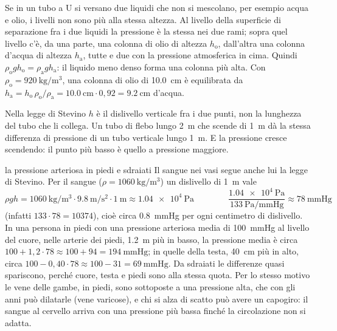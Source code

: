 Se in un tubo a U si versano due liquidi che non si mescolano, per esempio acqua e olio, i livelli non sono più alla stessa altezza. Al livello della superficie di separazione fra i due liquidi la pressione è la stessa nei due rami; sopra quel livello c'è, da una parte, una colonna di olio di altezza $h_\text{o}$, dall'altra una colonna d'acqua di altezza $h_\text{a}$, tutte e due con la pressione atmosferica in cima. Quindi $\rho_\text{o} g h_\text{o} = \rho_\text{a} g h_\text{a}$: il liquido meno denso forma una colonna più alta. Con $\rho_\text{o} = \SI{920}{\kilo\gram\per\metre\cubed}$, una colonna di olio di \SI{10,0}{\centi\metre} è equilibrata da $h_\text{a} = h_\text{o}\,\rho_\text{o}/\rho_\text{a} = \SI{10,0}{\centi\metre} \cdot 0{,}92 = \SI{9,2}{\centi\metre}$ d'acqua.

\begin{attenzione}
Nella legge di Stevino $h$ è il dislivello verticale fra i due punti, non la lunghezza del tubo che li collega. Un tubo di flebo lungo \SI{2}{\metre} che scende di \SI{1}{\metre} dà la stessa differenza di pressione di un tubo verticale lungo \SI{1}{\metre}. E la pressione cresce scendendo: il punto più basso è quello a pressione maggiore.
\end{attenzione}

\begin{applicazione}{la pressione arteriosa in piedi e sdraiati}
Il sangue nei vasi segue anche lui la legge di Stevino. Per il sangue ($\rho = \SI{1060}{\kilo\gram\per\metre\cubed}$) un dislivello di \SI{1}{\metre} vale
\[
  \rho g h = \SI{1060}{\kilo\gram\per\metre\cubed} \cdot \SI{9,8}{\metre\per\second\squared} \cdot \SI{1}{\metre} \approx \SI{1,04e4}{\pascal}
  \qquad\qquad
  \frac{\SI{1,04e4}{\pascal}}{\SI{133}{\pascal\per\mmHg}} \approx \SI{78}{\mmHg}
\]
(infatti $133 \cdot 78 = \num{10374}$), cioè circa \SI{0,8}{\mmHg} per ogni centimetro di dislivello. In una persona in piedi con una pressione arteriosa media di \SI{100}{\mmHg} al livello del cuore, nelle arterie dei piedi, \SI{1,2}{\metre} più in basso, la pressione media è circa $100 + 1{,}2 \cdot 78 \approx 100 + 94 = \SI{194}{\mmHg}$; in quelle della testa, \SI{40}{\centi\metre} più in alto, circa $100 - 0{,}40 \cdot 78 \approx 100 - 31 = \SI{69}{\mmHg}$. Da sdraiati le differenze quasi spariscono, perché cuore, testa e piedi sono alla stessa quota. Per lo stesso motivo le vene delle gambe, in piedi, sono sottoposte a una pressione alta, che con gli anni può dilatarle (vene varicose), e chi si alza di scatto può avere un capogiro: il sangue al cervello arriva con una pressione più bassa finché la circolazione non si adatta.
\end{applicazione}

